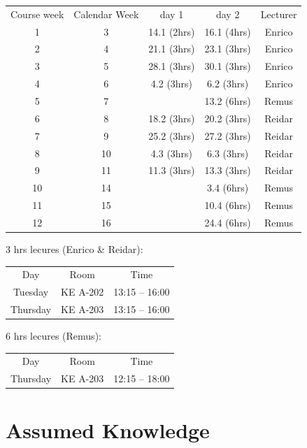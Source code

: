 \documentclass[letterpaper,12pt,oneside]{article}
\begin{document}
\begin{center}
\begin{tabular}{ c c c c c }

Course week & Calendar Week & day 1 & day 2 & Lecturer \\
1 &  3 & 14.1 (2hrs) & 16.1 (4hrs) & Enrico \\
2 &  4 & 21.1 (3hrs) & 23.1 (3hrs) & Enrico \\
3 &  5 & 28.1 (3hrs) & 30.1 (3hrs) & Enrico \\
4 &  6 &  4.2 (3hrs) &  6.2 (3hrs) & Enrico \\

5 &  7 & & 13.2 (6hrs) & Remus \\

6 &  8 & 18.2 (3hrs) & 20.2 (3hrs) & Reidar \\
7 &  9 & 25.2 (3hrs) & 27.2 (3hrs) & Reidar \\
8 &  10 &  4.3 (3hrs) & 6.3 (3hrs) & Reidar \\
9 &  11 & 11.3 (3hrs) & 13.3 (3hrs) & Reidar  \\

10 &  14 & &  3.4 (6hrs) & Remus \\
11 &  15 & & 10.4 (6hrs) & Remus \\
12 &  16 & & 24.4 (6hrs) & Remus 

\end{tabular}
\end{center}


3 hrs lecures (Enrico \& Reidar):  

\begin{center}
\begin{tabular}{ c c c  }
Day &  Room &  Time \\
Tuesday & KE A-202 & 13:15 – 16:00 \\
Thursday & KE A-203 & 13:15 – 16:00

\end{tabular}
\end{center}

6 hrs lecures (Remus): 

\begin{center}
\begin{tabular}{ c c c }
Day &  Room &  Time \\
Thursday & KE A-203 & 12:15 – 18:00

\end{tabular}
\end{center}


\section*{Assumed Knowledge}
 
\end{document}
